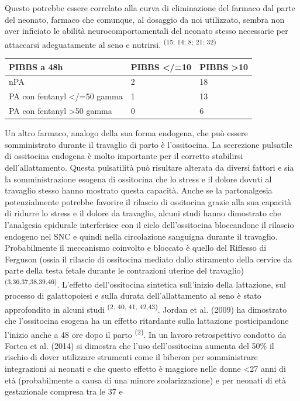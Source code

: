 \documentclass[]{article}
\begin{document}
Questo potrebbe essere correlato alla curva di eliminazione del farmaco
dal parte del neonato, farmaco che comunque, al dosaggio da noi
utilizzato, sembra non aver inficiato le abilità neurocomportamentali
del neonato stesso necessarie per attaccarsi adeguatamente al seno e
nutrirsi. \textsuperscript{(15; 14; 8; 21: 32) }

\begin{longtable}[]{@{}lll@{}}
\toprule
PIBBS a 48h & PIBBS \textless{}/=10 & PIBBS
\textgreater{}10\tabularnewline
\midrule
\endhead
nPA & 2 & 18\tabularnewline
PA con fentanyl \textless{}/=50 gamma & 1 & 13\tabularnewline
PA con fentanyl \textgreater{}50 gamma & 0 & 6\tabularnewline
\bottomrule
\end{longtable}

Un altro farmaco, analogo della sua forma endogena, che può essere
somministrato durante il travaglio di parto è l'ossitocina. La
secrezione pulsatile di ossitocina endogena è molto importante per il
corretto stabilirsi dell'allattamento. Questa pulsatilità può risultare
alterata da diversi fattori e sia la somministrazione esogena di
ossitocina che lo stress e il dolore dovuti al travaglio stesso hanno
mostrato questa capacità. Anche se la partonalgesia potenzialmente
potrebbe favorire il rilascio di ossitocina grazie alla sua capacità di
ridurre lo stress e il dolore da travaglio, alcuni studi hanno
dimostrato che l'analgesia epidurale interferisce con il ciclo
dell'ossitocina bloccandone il rilascio endogeno nel SNC e quindi nella
circolazione sanguigna durante il travaglio. Probabilmente il meccanismo
coinvolto e bloccato è quello del Riflesso di Ferguson (ossia il
rilascio di ossitocina mediato dallo stiramento della cervice da parte
della testa fetale durante le contrazioni uterine del travaglio)
\textsuperscript{(3,36,37,38,39,46)}. L'effetto dell'ossitocina
sintetica sull'inizio della lattazione, sul processo di galattopoiesi e
sulla durata dell'allattamento al seno è stato approfondito in alcuni
studi \textsuperscript{(2, 40, 41, 42,43)}. Jordan et al. (2009) ha
dimostrato che l'ossitocina esogena ha un effetto ritardante sulla
lattazione posticipandone l'inizio anche a 48 ore dopo il parto
\textsuperscript{(2)}. In un lavoro retrospettivo condotto da Fortea et
al. (2014) si dimostra che l'uso dell'ossitocina aumenta del 50\% il
rischio di dover utilizzare strumenti come il biberon per somministrare
integrazioni ai neonati e che questo effetto è maggiore nelle donne
\textless{}27 anni di età (probabilmente a causa di una minore
scolarizzazione) e per neonati di età gestazionale compresa tra le 37 e
\end{document}
